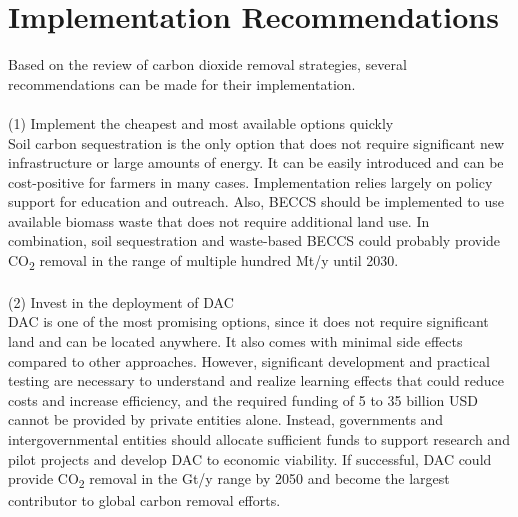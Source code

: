 \begin{sidewaystable}
\end{sidewaystable}
\FloatBarrier

\newpage
\section{Implementation Recommendations}
Based on the review of carbon dioxide removal strategies, several recommendations can be made for their implementation.\\
\\(1) Implement the cheapest and most available options quickly\\
Soil carbon sequestration is the only option that does not require significant new infrastructure or large amounts of energy. It can be easily introduced and can be cost-positive for farmers in many cases. Implementation relies largely on policy support for education and outreach. Also, BECCS should be implemented to use available biomass waste that does not require additional land use. In combination, soil sequestration and waste-based BECCS could probably provide CO\textsubscript{2} removal in the range of multiple hundred Mt/y until 2030.\\
\\(2) Invest in the deployment of DAC\\
DAC is one of the most promising options, since it does not require significant land and can be located anywhere. It also comes with minimal side effects compared to other approaches. However, significant development and practical testing are necessary to understand and realize learning effects that could reduce costs and increase efficiency, and the required funding of 5 to 35 billion USD cannot be provided by private entities alone. Instead, governments and intergovernmental entities should allocate sufficient funds to support research and pilot projects and develop DAC to economic viability. If successful, DAC could provide CO\textsubscript{2} removal in the Gt/y range by 2050 and become the largest contributor to global carbon removal efforts.\\
